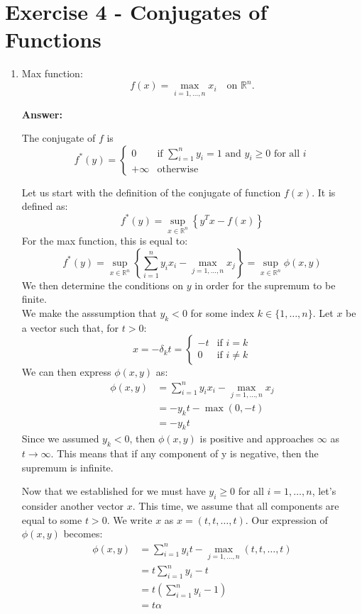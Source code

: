 \documentclass[11pt,a4paper]{article}
\newenvironment{solution}{
  \par\noindent\textbf{Answer:}\vspace{0.3em}
}{\vspace{1em}}
\begin{document}
\section{Exercise 4 - Conjugates of Functions}
\begin{enumerate}
    \item Max function:
    \[
    f(x) = \max_{i=1,\dots,n} x_i \quad \text{on } \mathbb{R}^n.
    \]

    \begin{solution}
        The conjugate of $f$ is
        \[
        f^*(y) = \begin{cases}
            0 & \text{if } \sum_{i=1}^n y_i = 1 \text{ and } y_i \geq 0 \text{ for all } i\\
            +\infty & \text{otherwise}
        \end{cases}
        \]

        Let us start with the definition of the conjugate of function $f(x)$. It is defined as:
        \[
            f^* (y) = \sup_{x \in \mathbb{R}^n} \left\{ y^T x - f(x)\right\}
        \]
        For the max function, this is equal to:
        \[
            f^* (y) = \sup_{x \in \mathbb{R}^n} \left\{ \sum_{i=1}^n y_i x_i - \max_{j=1, \dots, n} x_j \right\} = \sup_{x \in \mathbb{R}^n} \phi(x, y)
        \]
        We then determine the conditions on $y$ in order for the supremum to be finite.\\
        We make the asssumption that $y_k < 0$ for some index $k \in \{1, \dots, n\}$. Let $x$ be a vector such that, for $t > 0$: 
        \[
            x = - \delta_{k} t = \begin{cases}
                -t & \text{if } i = k\\
                0 & \text{if } i \neq k
            \end{cases}
        \]
        We can then express $\phi(x, y)$ as:
        \begin{align*}
            \phi(x, y)
            &= \sum_{i=1}^n y_i x_i - \max_{j=1, \dots, n} x_j\\
            &= -y_k t - \max(0, -t)\\
            &= -y_k t
        \end{align*}
        Since we assumed $y_k < 0$, then $\phi(x, y)$ is positive and approaches $\infty$ as $t \to \infty$. This means that if any component of y is negative, then the supremum is infinite.

        Now that we established for we must have $y_i \geq 0$ for all $i = 1, \dots, n$, let's consider another vector $x$. This time, we assume that all components are equal to some $t > 0$. We write $x$ as $x = (t, t, \dots, t)$. Our expression of $\phi(x, y)$ becomes:
        \begin{align*}
            \phi(x, y)
            &= \sum_{i=1}^n y_i t - \max_{j=1, \dots, n} (t, t, \dots, t)\\
            &= t \sum_{i=1}^n y_i - t\\
            &= t \left( \sum_{i=1}^n y_i - 1 \right)\\
            &= t \alpha
        \end{align*}


\end{solution}
\end{enumerate}
\end{document}
